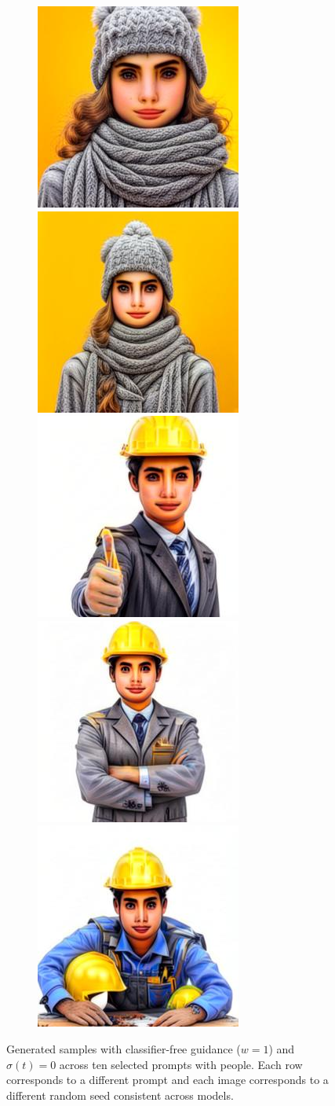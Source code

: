 \begin{figure}[h!]
\begin{subfigure}[t]{0.32\linewidth}
    	\includegraphics[width=0.32\linewidth]{figs/samples_appendix_4/draft1k_cfg_2_ode_prompt_61_image_1.jpg}\;%
    	\includegraphics[width=0.32\linewidth]{figs/samples_appendix_4/draft1k_cfg_2_ode_prompt_61_image_2.jpg}\\ 
    	\includegraphics[width=0.32\linewidth]{figs/samples_appendix_4/draft1k_cfg_2_ode_prompt_63_image_0.jpg}\;%
    	\includegraphics[width=0.32\linewidth]{figs/samples_appendix_4/draft1k_cfg_2_ode_prompt_63_image_1.jpg}\;%
    	\includegraphics[width=0.32\linewidth]{figs/samples_appendix_4/draft1k_cfg_2_ode_prompt_63_image_2.jpg}
    \end{subfigure}
    \caption{
    Generated samples with classifier-free guidance ($w=1$) and $\sigma(t) = 0$ across ten selected prompts with people.  Each row corresponds to a different prompt and each image corresponds to a different random seed consistent across models.
    }
    \label{fig:image_comparison_people}
\end{figure}

